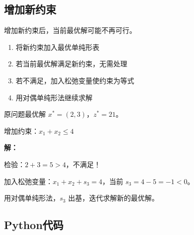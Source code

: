 \subsection{增加新约束}

增加新约束后，当前最优解可能不再可行。

\begin{algobox}[增加新约束的处理]
\begin{enumerate}
    \item 将新约束加入最优单纯形表
    \item 若当前最优解满足新约束，无需处理
    \item 若不满足，加入松弛变量使约束为等式
    \item 用对偶单纯形法继续求解
\end{enumerate}
\end{algobox}

\begin{example}[增加新约束]
原问题最优解 $x^* = (2, 3)$，$z^* = 21$。

增加约束：$x_1 + x_2 \leq 4$

\textbf{解：}

检验：$2 + 3 = 5 > 4$，不满足！

加入松弛变量：$x_1 + x_2 + s_3 = 4$，当前 $s_3 = 4 - 5 = -1 < 0$。

用对偶单纯形法，$s_3$ 出基，迭代求解新的最优解。
\end{example}

\subsection{Python代码}\label{sec:sensitivity-code}


